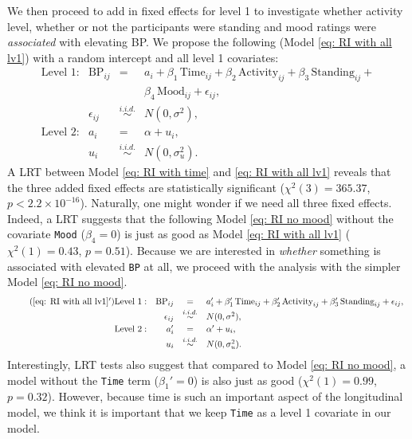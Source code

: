 \documentclass[12pt,twoside,letterpaper]{article}
\theoremstyle{definition}
\theoremstyle{definition}
\begin{document}
We then proceed to add in fixed effects for level 1 to investigate whether activity level, whether or not the participants were standing and mood ratings were \emph{associated} with elevating BP. We propose the following (Model \ref{eq: RI with all lv1}) with a random intercept and all level 1 covariates:
\begin{equation}\label{eq: RI with all lv1}
    \begin{array}{rrcll}
        \text{Level 1}: & \text{BP}_{ij} &=& a_i + \beta_1\, \text{Time}_{ij} + \beta_2\, \text{Activity}_{ij} + \beta_3\, \text{Standing}_{ij} + \\
        &&& \beta_4\, \text{Mood}_{ij} + \epsilon_{ij}, \\[0.5ex]
         & \epsilon_{ij} &\overset{i.i.d.}{\sim}& N(0, \sigma^2), \\[0.5ex]
        \text{Level 2}: & a_i &=& \alpha + u_i, \\[0.5ex]
         & u_{i} &\overset{i.i.d.}{\sim}& N(0, \sigma_u^2).
    \end{array}
\end{equation}
A LRT between Model \ref{eq: RI with time} and \ref{eq: RI with all lv1} reveals that the three added fixed effects are statistically significant ($\chi^2 (3) = 365.37$, $p < 2.2 \times 10^{-16}$). Naturally, one might wonder if we need all three fixed effects. Indeed, a LRT suggests that the following Model \ref{eq: RI no mood} without the covariate \texttt{Mood} ($\beta_4 = 0$) is just as good as Model \ref{eq: RI with all lv1} ($\chi^2 (1) = 0.43$, $p =0.51$). Because we are interested in \emph{whether} something is associated with elevated \texttt{BP} at all, we proceed with the analysis with the simpler Model \ref{eq: RI no mood}.
\begin{equation}\label{eq: RI no mood}
    \begin{array}{rrcll}\tag{\ref{eq: RI with all lv1}$'$}
        \text{Level 1}: & \text{BP}_{ij} &=& a_i' + \beta_1'\, \text{Time}_{ij} + \beta_2'\, \text{Activity}_{ij} + \beta_3'\, \text{Standing}_{ij} + \epsilon_{ij}, \\[0.5ex]
         & \epsilon_{ij} &\overset{i.i.d.}{\sim}& N(0, \sigma^2), \\[0.5ex]
        \text{Level 2}: & a_i' &=& \alpha' + u_i, \\[0.5ex]
         & u_{i} &\overset{i.i.d.}{\sim}& N(0, \sigma_u^2).
    \end{array}
\end{equation}
Interestingly, LRT tests also suggest that compared to Model \ref{eq: RI no mood}, a model without the \texttt{Time} term ($\beta_1' = 0$) is also just as good ($\chi^2 (1) = 0.99$, $p = 0.32$). However, because time is such an important aspect of the longitudinal model, we think it is important that we keep \texttt{Time} as a level 1 covariate in our model.
\end{document}
